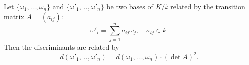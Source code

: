 Let $\{\omega_1, \dots, \omega_n\}$ and $\{\omega'_1, \dots, \omega'_n\}$ be two bases of $K/k$ related by the transition matrix $A = (a_{ij})$:
$$\omega'_i = \sum_{j=1}^{n} a_{ij} \omega_j, \quad a_{ij} \in k.$$
Then the discriminants are related by
$$d(\omega'_1, \dots, \omega'_n) = d(\omega_1, \dots, \omega_n) \cdot (\det A)^2.$$
